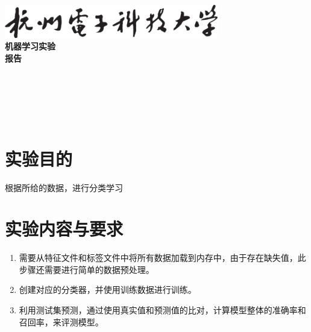 \documentclass[a4paper]{ctexart}
\begin{document}
  \begin{titlepage}
      \songti
      \begin{center}
        \vspace*{2cm}
        \includegraphics[width=0.7\textwidth]{../HDU.png}\\
        \vspace*{1cm}
        {\fontsize{36pt}{0}
          \textbf{机器学习实验\\报\quad 告\\}
        }
        \vspace*{12cm}
        {\fontsize{18pt}{0}
           \underline{}\\
          \vspace*{0.5cm}
           \underline{}\\
          \vspace*{0.5cm}
           \underline{}\\
          \vspace*{0.5cm}
           \underline{}\\
          \vspace*{0.5cm}
           \underline{}\\
        }
      \end{center}
  \end{titlepage}


  \newpage
  \section{实验目的}
  根据所给的数据，进行分类学习

  \section{实验内容与要求}
  \begin{enumerate}
    \item 需要从特征文件和标签文件中将所有数据加载到内存中，由于存在缺失值，此步骤还需要进行简单的数据预处理。
    \item 创建对应的分类器，并使用训练数据进行训练。
    \item 利用测试集预测，通过使用真实值和预测值的比对，计算模型整体的准确率和召回率，来评测模型。
  \end{enumerate}
\end{document}
